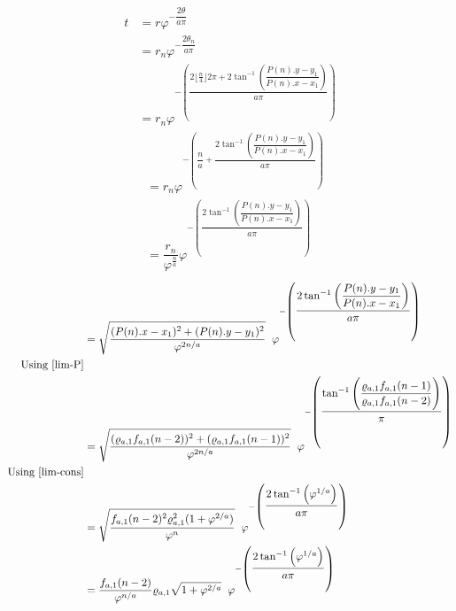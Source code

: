 \documentclass[preprint,12pt]{elsarticle}
\begin{document}
\begin{align*}
	t & = r\varphi^{-\dfrac{2\theta}{a\pi}}                                                                                                   \\
	  & = r_n\varphi^{-\dfrac{2\theta_n}{a\pi}}                                                                                               \\
	  & = r_n\varphi^{-\left(\dfrac{2\lfloor\frac{n}{4}\rfloor2\pi + 2\tan^{-1}{\left(\dfrac{P(n).y-y_1}{P(n).x - x_1}\right)}}{a\pi}\right)} 
\end{align*}
\begin{align*}
	  & = r_n\varphi^{-\left(\dfrac{n}{a} + \dfrac{ 2\tan^{-1}{\left(\dfrac{P(n).y-y_1}{P(n).x - x_1}\right)}}{a\pi}\right)}                 \\
	  & = \dfrac{r_n}{\varphi^{\frac{n}{a}}}\varphi^{-\left(\dfrac{ 2\tan^{-1}{\left(\dfrac{P(n).y-y_1}{P(n).x - x_1}\right)}}{a\pi}\right)} 
\end{align*}
\begin{align*}
	  & = \sqrt{\dfrac{(P(n).x-x_1)^2 + (P(n).y-y_1)^2}{\varphi^{2n/a}}}\hspace{2mm}\varphi^{-\left(\dfrac{ 2\tan^{-1}{\left(\dfrac{P(n).y-y_1}{P(n).x - x_1}\right)}}{a\pi}\right)}                                                         \\
	\text{Using \ref{lim-P}}\\
	  & = \sqrt{\dfrac{(\varrho_{a,1}f_{a,1}(n-2))^2 + (\varrho_{a,1}f_{a,1}(n-1))^2}{\varphi^{2n/a}}}\hspace{2mm}\varphi^{-\left(\dfrac{ \tan^{-1}{\left(\dfrac{\varrho_{a,1}f_{a,1}(n-1)}{\varrho_{a,1}f_{a,1}(n-2)}\right)}}{\pi}\right)} \\
	\text{Using \ref{lim-cons}}\\
	  & = \sqrt{\dfrac{f_{a,1}(n-2)^2 \varrho_{a,1}^2(1 + \varphi^{2/a})}{\varphi^n}}\hspace{2mm}\varphi^{-\left(\dfrac{ 2\tan^{-1}{\left(\varphi^{1/a}\right)}}{a\pi}\right)}                                                               \\
	  & = \dfrac{f_{a,1}(n-2) }{\varphi^{n/a}}\varrho_{a,1}\sqrt{1 + \varphi^{2/a}}\hspace{2mm}\varphi^{-\left(\dfrac{ 2\tan^{-1}{\left(\varphi^{1/a}\right)}}{a\pi}\right)}                                                                 
\end{align*}
\clearpage
\end{document}
